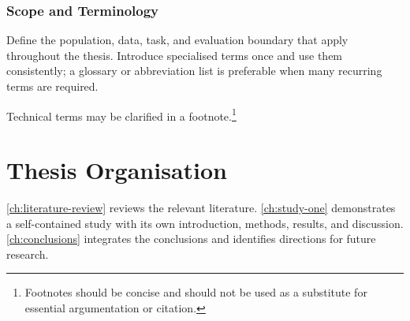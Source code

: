 \subsubsection{Scope and Terminology}

Define the population, data, task, and evaluation boundary that apply throughout
the thesis. Introduce specialised terms once and use them consistently; a glossary
or abbreviation list is preferable when many recurring terms are required.

Technical terms may be clarified in a footnote.\footnote{Footnotes should be concise and should not be used as a substitute for essential argumentation or citation.}

\section{Thesis Organisation}

\cref{ch:literature-review} reviews the relevant literature. \cref{ch:study-one}
demonstrates a self-contained study with its own introduction, methods, results,
and discussion. \cref{ch:conclusions} integrates the conclusions and identifies
directions for future research.
